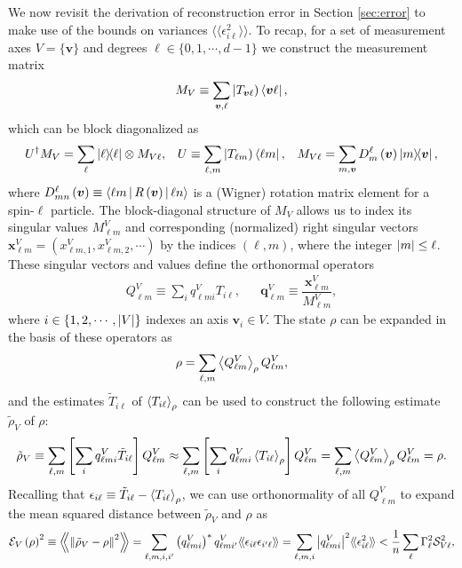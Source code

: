 \documentclass[notitlepage,twocolumn]{revtex4-2}
\newcommand{\f}[2]{\dfrac{#1}{#2}} %
\newcommand{\p}[1]{\left(#1\right)} %
\renewcommand{\sp}[1]{\left[#1\right]} %
\newcommand{\bk}{\Braket} %
\renewcommand{\v}{\bm} %
\renewcommand{\set}[1]{\{#1\}} %
\newcommand{\bbk}[1]{\langle\!\langle #1 \rangle\!\rangle}
\newcommand{\Bbk}[1]
{\left\langle\!\!\left\langle #1 \right\rangle\!\!\right\rangle}
\newcommand{\E}{\mathcal{E}}
\renewcommand{\S}{\mathcal{S}}
\def\oket#1{\mathinner{|{#1})}}
\begin{document}
We now revisit the derivation of reconstruction error in Section \ref{sec:error} to make use of the bounds on variances $\bbk{\epsilon_{i\ell}^2}$.
To recap, for a set of measurement axes $V=\set{\v v}$ and degrees $\ell\in\set{0,1,\cdots,d-1}$ we construct the measurement matrix
\begin{align}
  M_V \equiv \sum_{\v v,\ell} \oket{T_{\v v\ell}} \bra{\v v\ell},
\end{align}
which can be block diagonalized as
\begin{align}
  U^\dag M_V = \sum_\ell \op{\ell} \otimes M_{V\ell},
  &&
  U \equiv \sum_{\ell,m} \oket{T_{\ell m}} \bra{\ell m},
  &&
  M_{V\ell} = \sum_{m,\v v} D^\ell_m\p{\v v} \op{m}{\v v},
\end{align}
where $D^\ell_{mn}\p{\v v}\equiv\bk{\ell m|R\p{\v v}|\ell n}$ is a (Wigner) rotation matrix element for a spin-$\ell$ particle.
The block-diagonal structure of $M_V$ allows us to index its singular values $M^V_{\ell m}$ and corresponding (normalized) right singular vectors $\v x^V_{\ell m} = (x^V_{\ell m,1}, x^V_{\ell m,2}, \cdots )$ by the indices $\p{\ell,m}$, where the integer $\abs{m}\le\ell$.
These singular vectors and values define the orthonormal operators
\begin{align}
  Q^V_{\ell m} \equiv \sum_i q^V_{\ell mi} T_{i\ell},
  &&
  \v q^V_{\ell m} \equiv \f{\v x^V_{\ell m}}{M^V_{\ell m}},
\end{align}
where $i\in\set{1,2,\cdots,\abs{V}}$ indexes an axis $\v v_i\in V$.
The state $\rho$ can be expanded in the basis of these operators as
\begin{align}
  \rho = \sum_{\ell,m} \bk{Q^V_{\ell m}}_\rho Q^V_{\ell m},
\end{align}
and the estimates $\tilde T_{i\ell}$ of $\bk{T_{i\ell}}_\rho$ can be used to construct the following estimate $\tilde\rho_V$ of $\rho$:
\begin{align}
  \tilde\rho_V \equiv \sum_{\ell,m}
  \sp{\sum_i q^V_{\ell mi} \tilde T_{i\ell}} Q^V_{\ell m}
  \approx \sum_{\ell,m}
  \sp{\sum_i q^V_{\ell mi} \bk{T_{i\ell}}_\rho} Q^V_{\ell m}
  = \sum_{\ell,m} \bk{Q^V_{\ell m}}_\rho Q^V_{\ell m}
  = \rho.
\end{align}
Recalling that $\epsilon_{i\ell} \equiv \tilde T_{i\ell} - \bk{T_{i\ell}}_\rho$, we can use orthonormality of all $Q^V_{\ell m}$ to expand the mean squared distance between $\tilde\rho_V$ and $\rho$ as
\begin{align}
  \E_V\p{\rho}^2 \equiv \Bbk{\norm{\tilde\rho_V-\rho}^2}
  = \sum_{\ell,m,i,i'} \p{q^V_{\ell mi}}^* q^V_{\ell mi'} \bbk{\epsilon_{i\ell} \epsilon_{i'\ell}}
  = \sum_{\ell,m,i} \abs{q^V_{\ell mi}}^2 \bbk{\epsilon_{i\ell}^2}
  < \f1n \sum_\ell \Gamma_\ell^2 \S_{V\ell}^2,
  \label{eq:bound_apndx}
\end{align}
\end{document}
